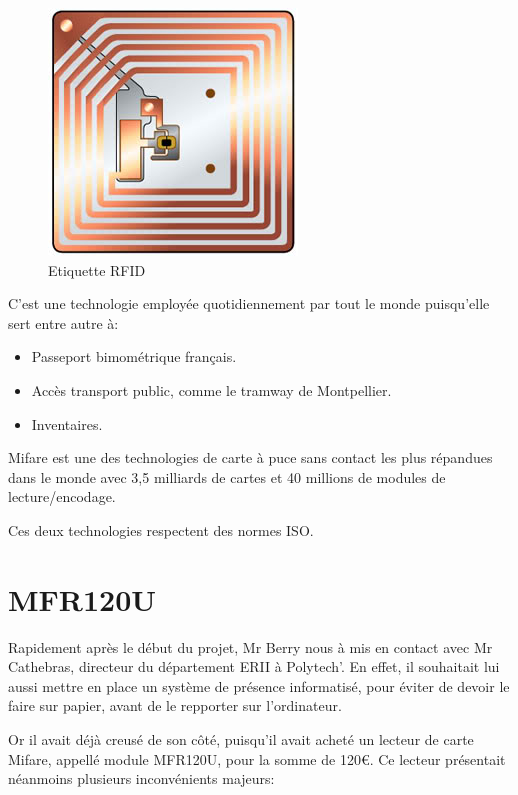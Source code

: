     \begin{figure}[h]
        \begin{center}
            \includegraphics[scale=0.6]{RFIDtag.jpg} 
        \end{center}

        \caption{Etiquette RFID}
        \label{Etiquette RFID}
    \end{figure}


C'est une technologie employée quotidiennement par tout le monde puisqu'elle
sert entre autre à:

\begin{itemize}
\item Passeport bimométrique français.
\item Accès transport public, comme le tramway de Montpellier.
\item Inventaires.
\end{itemize}

Mifare est une des technologies de carte à puce sans contact les plus répandues
dans le monde avec 3,5 milliards de cartes et 40 millions de modules de lecture/encodage.

Ces deux technologies respectent des normes ISO.




\section{MFR120U}
    Rapidement après le début du projet, Mr Berry nous à mis en contact avec Mr
Cathebras, directeur du département ERII à Polytech'. En effet, il souhaitait lui
aussi mettre en place un système de présence informatisé, pour éviter de devoir
le faire sur papier, avant de le repporter sur l'ordinateur.

    Or il avait déjà creusé de son côté, puisqu'il avait acheté un lecteur de carte 
Mifare, appellé module MFR120U, pour la somme de 120\euro. Ce lecteur présentait néanmoins
plusieurs inconvénients majeurs:

